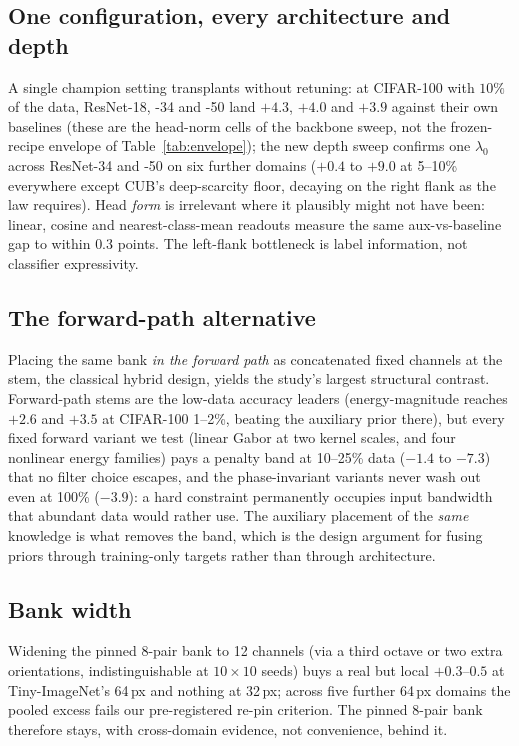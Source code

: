 \subsection{One configuration, every architecture and depth}\label{abl:universal}
A single champion setting transplants without retuning: at CIFAR-100 with
$10\%$ of the data, ResNet-18, -34 and -50 land $+4.3$, $+4.0$ and $+3.9$
against their own baselines (these are the head-norm cells of the
backbone sweep, not the frozen-recipe envelope of
Table~\ref{tab:envelope}); the new depth
sweep confirms one $\lambda_0$ across ResNet-34 and -50 on six further
domains ($+0.4$ to $+9.0$
at 5--10\% everywhere except CUB's deep-scarcity floor, decaying on the
right flank as the law requires). Head \emph{form} is irrelevant where it
plausibly might not have been: linear, cosine and nearest-class-mean readouts
measure the same aux-vs-baseline gap to within $0.3$ points. The left-flank
bottleneck is label information, not classifier expressivity.

\subsection{The forward-path alternative}\label{abl:forward}
Placing the same bank \emph{in the forward path} as concatenated fixed
channels at the stem, the classical hybrid design, yields the study's largest
structural contrast. Forward-path stems are the low-data
accuracy leaders (energy-magnitude reaches $+2.6$ and $+3.5$ at CIFAR-100
1--2\%, beating the auxiliary prior there), but every fixed forward
variant we test (linear Gabor at two kernel scales, and four nonlinear energy
families) pays a penalty band at 10--25\% data ($-1.4$ to $-7.3$) that no
filter choice escapes, and the phase-invariant variants
never wash out even at 100\% ($-3.9$): a hard constraint permanently
occupies input bandwidth that abundant data would rather use. The
auxiliary placement of the \emph{same} knowledge is what removes the
band, which is the design argument for fusing priors through
training-only targets rather than through architecture.

\subsection{Bank width}\label{abl:width}
Widening the pinned 8-pair bank to 12 channels (via a third octave or two
extra orientations, indistinguishable at $10{\times}10$ seeds) buys a
real but local $+0.3$--$0.5$ at Tiny-ImageNet's 64\,px and nothing at
32\,px; across five further 64\,px domains the pooled excess fails our
pre-registered re-pin criterion. The pinned 8-pair bank therefore
stays, with cross-domain evidence, not convenience, behind it.

